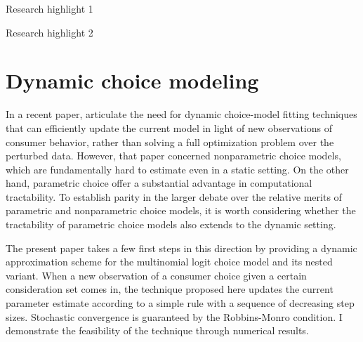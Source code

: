 \documentclass[preprint,12pt,authoryear]{elsarticle}
\begin{document}
\begin{frontmatter}
\begin{graphicalabstract}
\end{graphicalabstract}

\begin{highlights}
\item Research highlight 1
\item Research highlight 2
\end{highlights}

\begin{keyword}



\end{keyword}

\end{frontmatter}




\section{Dynamic choice modeling}
In a recent paper, \cite{honguyen2021} articulate the need for dynamic choice-model fitting techniques that can efficiently update the current model in light of new observations of consumer behavior, rather than solving a full optimization problem over the perturbed data. However, that paper concerned nonparametric choice models, which are fundamentally hard to estimate even in a static setting. On the other hand, parametric choice offer a substantial advantage in computational tractability. To establish parity in the larger debate over the relative merits of parametric and nonparametric choice models, it is worth considering whether the tractability of parametric choice models also extends to the dynamic setting. 

The present paper takes a few first steps in this direction by providing a dynamic approximation scheme for the multinomial logit choice model and its nested variant. When a new observation of a consumer choice given a certain consideration set comes in, the technique proposed here updates the current parameter estimate according to a simple rule with a sequence of decreasing step sizes. Stochastic convergence is guaranteed by the Robbins-Monro condition. I demonstrate the feasibility of the technique through numerical results. 
\end{document}
